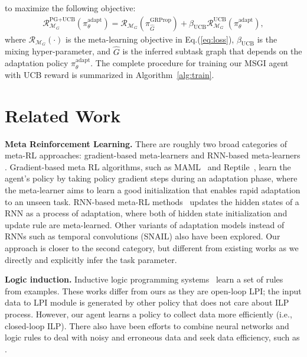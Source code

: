 \documentclass{article} \usepackage{iclr2020_conference,times}
\newcommand{\nti}{{MSGI}}
\newcommand{\mc}{\mathcal}
\newcommand{\cutsectiondown}{\vspace*{-0.05in}}
\newcommand{\cutparagraphup}{\vspace{-2pt}}
\begin{document}
to maximize the following objective: \begin{align}
    \mc{R}^{\text{PG+UCB}}_{\mc{M}_G} \left( \pi^\text{adapt}_{\theta} \right)
    = \mc{R}_{\mc{M}_G} \left( \pi^{\text{GRProp}}_{\widehat{G}} \right) + \beta_{\text{UCB}} \mc{R}^{\text{UCB}}_{\mc{M}_G} \left( \pi^\text{adapt}_{\theta} \right),  \label{eq:final-loss}
\end{align}
where $\mc{R}_{\mc{M}_G} (\cdot)$ is the meta-learning objective in Eq.(\ref{eq:loss}), $\beta_{\text{UCB}}$ is the mixing hyper-parameter, and $\widehat{G}$ is the inferred subtask graph that depends on the adaptation policy $\pi^\text{adapt}_{\theta}$.
The complete procedure for training our \nti{} agent with UCB reward is summarized in Algorithm~\ref{alg:train}.


 \section{Related Work}\label{sec:r}
\cutsectiondown

\textbf{Meta Reinforcement Learning.}
There are roughly two broad categories of meta-RL approaches: gradient-based meta-learners \citep{finn2017model,nichol2018first,Gupta:1802.07245,Finn2018PMAML,Kim:2018:BMAML}
and RNN-based meta-learners \citep{duan2016rl,wang2016learning}.
Gradient-based meta RL algorithms, such as MAML~\citep{finn2017model} and Reptile~\citep{nichol2018first},
learn the agent's policy by taking policy gradient steps during an adaptation phase,
where the meta-learner aims to learn a good initialization that enables rapid adaptation to an unseen task.
RNN-based meta-RL methods~\citep{duan2016rl, wang2016learning} updates the hidden states of a RNN as a process of adaptation,
where both of hidden state initialization and update rule are meta-learned.
Other variants of adaptation models instead of RNNs such as temporal convolutions (SNAIL) \citep{Mishra2018SNAIL} also have been explored.
Our approach is closer to the second category, but different from existing works
as we directly and explicitly infer the task parameter.




\cutparagraphup
\textbf{Logic induction.}
Inductive logic programming systems~\citep{Muggleton:1991:ILP} learn a set of rules
from examples.
\citep{NTP}
These works differ from ours as they are open-loop LPI; the input data to LPI module is generated by other policy that does not care about ILP process.
However, our agent learns a policy to collect data more efficiently (i.e., closed-loop ILP).
There also have been efforts to combine neural networks and logic rules
to deal with noisy and erroneous data and seek data efficiency,
such as \citep{Hu2016ACL,Evans2017dILP,Dong2019NeuralLogic}.
\end{document}
